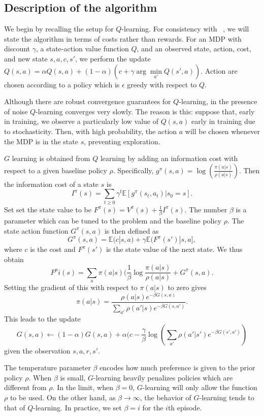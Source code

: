 \documentclass{article}
\begin{document}
\subsection{Description of the algorithm}

We begin by recalling the setup for $Q$-learning. For consistency with ~\cite{foxPakmanTishby}, we will state the algorithm in terms of costs rather than rewards. For an MDP with discount $\gamma$, a state-action value function $Q$, and an observed state, action, cost, and new state $s,a,c,s'$, we perform the update $Q(s,a)=\alpha Q(s,a) + (1-\alpha) (c + \gamma \arg \min\limits_{a'} Q(s',a))$. Action are chosen according to a policy which is $\epsilon$ greedy with respect to $Q$.

Although there are robust convergence guarantees for $Q$-learning, in the presence of noise $Q$-learning converges very slowly. The reason is this: suppose that, early in training, we observe a particularly low value of $Q(s,a)$ early in training due to stochasticity. Then, with high probability, the action $a$ will be chosen whenever the MDP is in the state $s$, preventing exploration.

$G$ learning is obtained from $Q$ learning by adding an information cost with respect to a given baseline policy $\rho$. Specifically, $g^\pi(s,a) = \log(\frac{\pi(a | s)}{\rho(a | s)})$. Then the information cost of a state $s$ is
\[
    I^\pi(s) = \sum\limits_{t \geq 0} \gamma^t \mathbb E [g^\pi(s_t,a_t) | s_0 = s].
\]
Set set the state value to be $F^\pi(s) = V^\pi(s) + \frac{1}{\beta} I^\pi(s)$. The number $\beta$ is a parameter which can be tuned to the problem and the baseline policy $\rho$. The state action function $G^\pi(s,a)$ is then defined as
\[
    G^\pi(s,a) = \mathbb E(c|s,a) + \gamma \mathbb E(F^\pi(s')|s,a],
\]
where $c$ is the cost and $F^\pi(s')$ is the state value of the next state. We thus obtain 
\[
    F^pi(s) = \sum\limits_{a} \pi(a|s) (\frac{1}{\beta} \log \frac{\pi(a|s)}{\rho(a|s)} + G^\pi(s,a).
\]
Setting the gradient of this with respect to $\pi(a|s)$ to zero gives
\[
    \pi(a|s) = \frac{\rho(a|s) e^{-\beta G(s,a)}}{\sum\limits_{a'} \rho(a'|s) e^{-\beta G(s,a')}}.
\]
This leads to the update
\[
    G(s,a) \leftarrow (1-\alpha) G(s,a) + \alpha(c - \frac{\gamma}{\beta} \log(\sum\limits_{a'} \rho(a'|s') e^{-\beta G(s',a')})
\]
given the observation $s,a,r,s'$.

The temperature parameter $\beta$ encodes how much preference is given to the prior policy $\rho$. When $\beta$ is small, $G$-learning heavily penalizes policies which are different from $\rho$. In the limit, when $\beta = 0$, $G$-learning will only allow the function $\rho$ to be used. On the other hand, as $\beta \to \infty$, the behavior of $G$-learning tends to that of $Q$-learning. In practice, we set $\beta = i$ for the $i$th episode.
\end{document}
